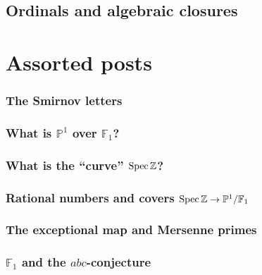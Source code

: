 \documentclass[a4paper]{memoir}
\begin{document}
\chapter{Ordinals and algebraic closures}




\part{Assorted posts}

\setcounter{section}{0}
\renewcommand\leftmark{ASSORTED POSTS}
\renewcommand{\thesection}{\Alph{section}}

\section{The Smirnov letters}


\section{What is \texorpdfstring{$\mathbb{P}^1$}{the projective line} over \texorpdfstring{$\mathbb{F}_1$}{F\_un}?}


\section{What is the ``curve'' \texorpdfstring{$\operatorname{Spec}\mathbb{Z}$}{Spec Z}?}


\section{Rational numbers and covers \texorpdfstring{$\operatorname{Spec}\mathbb{Z}\to\mathbb{P}^1/\mathbb{F}_1$}{}}


\section{The exceptional map and Mersenne primes}


\section{\texorpdfstring{$\mathbb{F}_1$}{F\_un} and the \texorpdfstring{$abc$}{abc}-conjecture}

\end{document}
